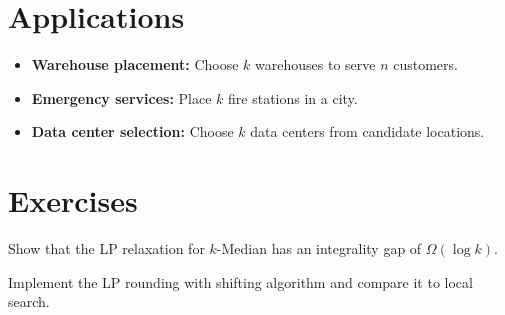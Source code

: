 \section{Applications}
\begin{itemize}
    \item \textbf{Warehouse placement:} Choose $k$ warehouses to serve $n$ customers.
    \item \textbf{Emergency services:} Place $k$ fire stations in a city.
    \item \textbf{Data center selection:} Choose $k$ data centers from candidate locations.
\end{itemize}

\section{Exercises}
\begin{exercise}
Show that the LP relaxation for $k$-Median has an integrality gap of $\Omega(\log k)$.
\end{exercise}
\begin{exercise}
Implement the LP rounding with shifting algorithm and compare it to local search.
\end{exercise}

